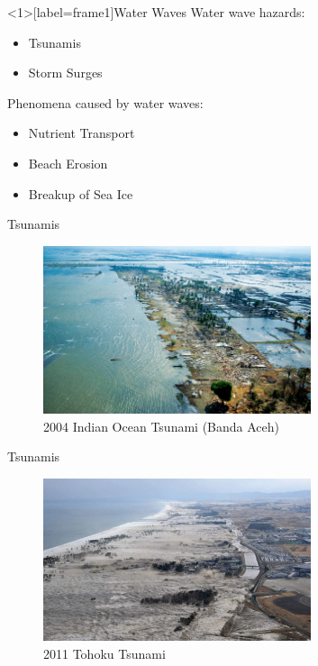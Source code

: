\documentclass[]{beamer}
\begin{document}
\begin{frame}<1>[label=frame1]{Water Waves}
	\pause
	Water wave hazards:
	\begin{itemize}
		\item Tsunamis
		\pause
		\item Storm Surges
		\pause
	\end{itemize}
	\smallskip
	Phenomena caused by water waves:
	\begin{itemize}
		\item Nutrient Transport
		\item Beach Erosion
		\item Breakup of Sea Ice
	\end{itemize}
\end{frame}
\begin{frame}{Tsunamis}
	\begin{figure}
		\includegraphics[width=0.7\textwidth]{./Pics/Examples/Coast_of_Banda_Aceh_2-12-05_050212-N-1450G-012.png}
		\caption{2004 Indian Ocean Tsunami (Banda Aceh)}
	\end{figure}
\end{frame}
\begin{frame}{Tsunamis}
	\begin{figure}
	\includegraphics[width=0.7\textwidth]{./Pics/Examples/Tohoku-Tsunami.jpg}
	\caption{2011 Tohoku Tsunami}
	\end{figure}
\end{frame}
\end{document}
